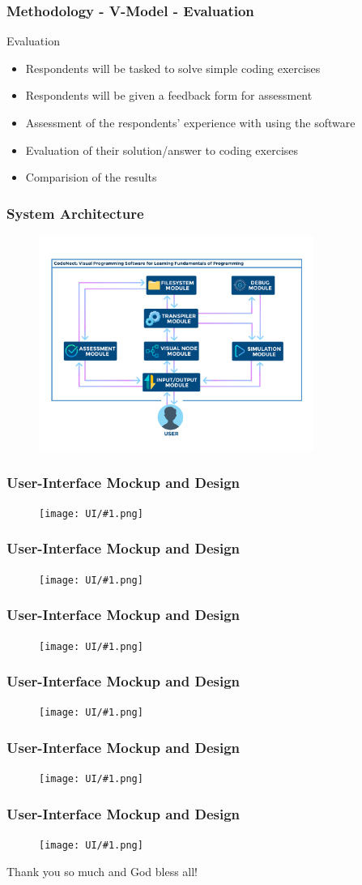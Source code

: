 \documentclass[handout]{beamer}
\newcommand{\ui}[1]{
	\begin{frame}
		\frametitle{User-Interface Mockup and Design}
		\begin{figure}
			\texttt{[image: UI/\#1.png]}
		\end{figure}
	\end{frame}
}
\begin{document}
\begin{frame}
	\frametitle{Methodology - V-Model - Evaluation}
	\begin{block}{Evaluation}
		\begin{itemize}
			\item<1-> Respondents will be tasked to solve simple coding exercises
			\item<2-> Respondents will be given a feedback form for assessment
			\item<3-> Assessment of the respondents' experience with using the software
			\item<4-> Evaluation of their solution/answer to coding exercises
			\item<5-> Comparision of the results
		\end{itemize}
	\end{block}
\end{frame}

\begin{frame}
	\frametitle{System Architecture}
	\begin{figure}
		\includegraphics[width=0.8\textwidth]{figures/theoretical_framework.png}
	\end{figure}
\end{frame}

\ui{final1}
\ui{final2}
\ui{final3}
\ui{final4}
\ui{final5}
\ui{final6}

\begin{frame}
	\centering
	\huge Thank you so much and God bless all!
\end{frame}
\end{document}
